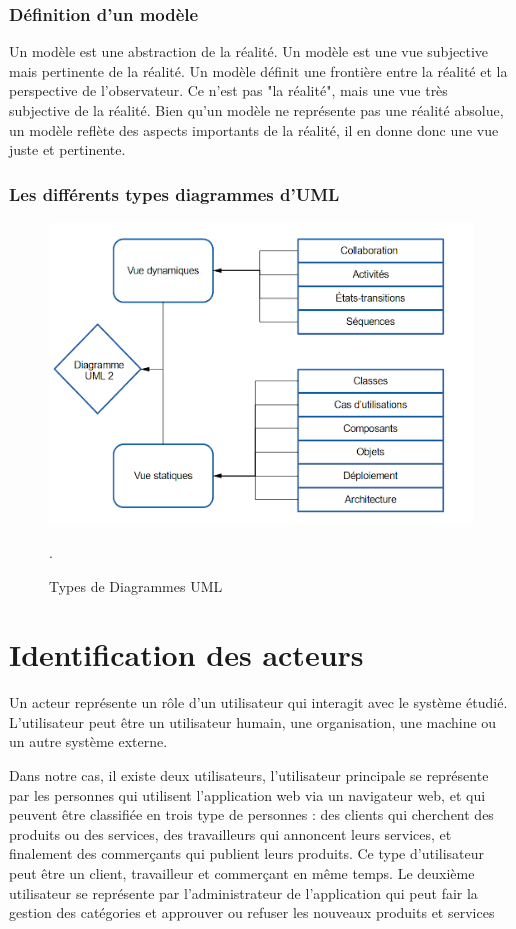\subsubsection{Définition d’un modèle }
\par Un modèle est une abstraction de la réalité. Un modèle est une vue
subjective mais pertinente de la réalité. Un modèle définit une frontière entre
la réalité et la perspective de l'observateur. Ce n'est pas "la réalité", mais
une vue très subjective de la réalité. Bien qu'un modèle ne représente pas une
réalité absolue, un modèle reflète des aspects importants de la réalité, il en
donne donc une vue juste et pertinente.
\subsubsection{Les différents types diagrammes d’UML}
\begin{figure}[H]
\centering
\includegraphics[height=8cm]{images/TypeDiagrammesUML.png}
\caption{Types de Diagrammes UML \cite{ref3}}.
\label{fig:my_label}
\end{figure}
\section{Identification des acteurs }
\par Un acteur représente un rôle d'un utilisateur qui interagit avec le
système étudié. L'utilisateur peut être un utilisateur humain, une
organisation, une machine ou un autre système externe.\cite{ref4}
\par Dans notre cas, il existe deux utilisateurs, l’utilisateur principale se
représente par les personnes qui utilisent l’application web via un navigateur
web, et qui peuvent être classifiée en trois type de personnes : des clients
qui cherchent des produits ou des services, des travailleurs qui annoncent
leurs services, et finalement des commerçants qui publient leurs produits. Ce
type d’utilisateur peut être un client, travailleur et commerçant en même
temps. Le deuxième utilisateur se représente par l’administrateur de
l’application qui peut fair la gestion des catégories et approuver ou refuser
les nouveaux produits et services
